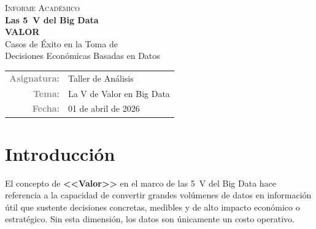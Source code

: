 \documentclass[12pt, a4paper]{article}
\begin{document}
\begin{titlepage}

\vspace*{4cm}

\begin{center}
  {\fontsize{14}{16}\selectfont\color{graytext}\textsc{Informe Académico}}\\[0.8cm]
  {\fontsize{32}{36}\selectfont\bfseries\color{primary}Las 5~V del Big Data}\\[0.4cm]
  {\fontsize{22}{26}\selectfont\color{accent}\bfseries VALOR}\\[1.5cm]
  {\large\color{darktext}Casos de Éxito en la Toma de\\
   Decisiones Económicas Basadas en Datos}\\[3cm]

  \begin{tabular}{rl}
    \textcolor{graytext}{\textbf{Asignatura:}} & Taller de Análisis \\[4pt]
    \textcolor{graytext}{\textbf{Tema:}}       & La V de Valor en Big Data \\[4pt]
    \textcolor{graytext}{\textbf{Fecha:}}      & 01 de abril de 2026 \\
  \end{tabular}
\end{center}
\end{titlepage}

\section{Introducción}

El concepto de \textbf{<<Valor>>} en el marco de las 5~V del Big Data hace referencia a la capacidad de convertir grandes volúmenes de datos en información útil que sustente decisiones concretas, medibles y de alto impacto económico o estratégico. Sin esta dimensión, los datos son únicamente un costo operativo.
\end{document}
